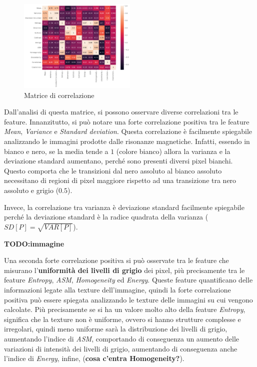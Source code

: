\begin{figure}[!ht]
      \centering
      \includegraphics[width=0.5\textwidth]{img/analisi/corr.png}
      \caption{Matrice di correlazione}
      \label{fig:corr-matrix}
\end{figure}

Dall'analisi di questa matrice, si possono osservare diverse correlazioni tra le
feature. Innanzitutto, si può notare una forte correlazione positiva tra le feature
\textit{Mean}, \textit{Variance} e \textit{Standard deviation}. Questa correlazione
è facilmente spiegabile analizzando le immagini prodotte dalle risonanze magnetiche.
Infatti, essendo in bianco e nero, se la media tende a $1$ (colore bianco) allora
la varianza e la deviazione standard aumentano, perché sono presenti diversi
pixel bianchi. Questo comporta che le transizioni dal nero assoluto al bianco
assoluto necessitano di regioni di pixel maggiore rispetto ad una transizione
tra nero assoluto e grigio ($0.5$).

Invece, la correlazione tra varianza è deviazione standard facilmente spiegabile
perché la deviazione standard è la radice quadrata della varianza ($SD[P] = \sqrt{VAR[P]}$).

\textbf{TODO:immagine}

Una seconda forte correlazione positiva si può osservate tra le feature che
misurano l'\textbf{uniformità dei livelli di grigio} dei pixel, più precisamente
tra le feature \textit{Entropy}, \textit{ASM}, \textit{Homogeneity} ed
\textit{Energy}. Queste feature quantificano delle informazioni legate alla
texture dell'immagine, quindi la forte correlazione positiva può essere spiegata
analizzando le texture delle immagini su cui vengono calcolate. Più precisamente
se si ha un valore molto alto della feature \textit{Entropy}, significa che la
texture non è uniforme, ovvero si hanno strutture complesse e irregolari, quindi
meno uniforme sarà la distribuzione dei livelli di grigio, aumentando l'indice
di \textit{ASM}, comportando di conseguenza un aumento delle variazioni di intensità
dei livelli di grigio, aumentando di conseguenza anche l'indice di \textit{Energy},
infine, (\textbf{cosa c'entra Homogeneity?}).

